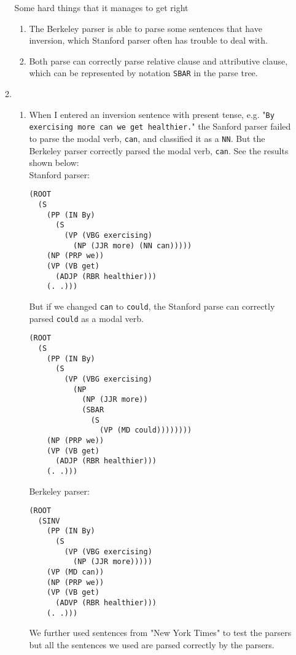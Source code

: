\documentclass[10pt]{article}
\begin{document}
\begin{enumerate}
\begin{enumerate}
\begin{enumerate}
        \end{enumerate}
        
        Some hard things that it manages to get right
        \begin{enumerate}
			\item
            The Berkeley parser is able to parse some sentences that have inversion, which Stanford parser often has trouble to deal with.
            
            \item
            Both parse can correctly parse relative clause and attributive clause, which can be represented by notation \texttt{SBAR} in the parse tree.
            
		\end{enumerate}
        \item %
        \begin{enumerate}
        	\item When I entered an inversion sentence with present tense, e.g. "\texttt{By exercising more can we get healthier.}" the Sanford parser failed to parse the modal verb, \texttt{can}, and classified it as a \texttt{NN}. But the Berkeley parser correctly parsed the modal verb, \texttt{can}. See the results shown below:\\
            
Stanford parser:
\begin{verbatim}
(ROOT
  (S
    (PP (IN By)
      (S
        (VP (VBG exercising)
          (NP (JJR more) (NN can)))))
    (NP (PRP we))
    (VP (VB get)
      (ADJP (RBR healthier)))
    (. .)))
\end{verbatim}
But if we changed \texttt{can} to \texttt{could}, the Stanford parse can correctly parsed \texttt{could} as a modal verb.
\begin{verbatim}
(ROOT
  (S
    (PP (IN By)
      (S
        (VP (VBG exercising)
          (NP
            (NP (JJR more))
            (SBAR
              (S
                (VP (MD could))))))))
    (NP (PRP we))
    (VP (VB get)
      (ADJP (RBR healthier)))
    (. .)))
\end{verbatim}
\bigskip
Berkeley parser:
\begin{verbatim}
(ROOT
  (SINV
    (PP (IN By)
      (S
        (VP (VBG exercising)
          (NP (JJR more)))))
    (VP (MD can))
    (NP (PRP we))
    (VP (VB get)
      (ADVP (RBR healthier)))
    (. .)))
\end{verbatim}
\bigskip
We further used sentences from "New York Times" to test the parsers but all the sentences we used are parsed correctly by the parsers.\\


\end{enumerate}
\end{enumerate}
\end{enumerate}
\end{document}
